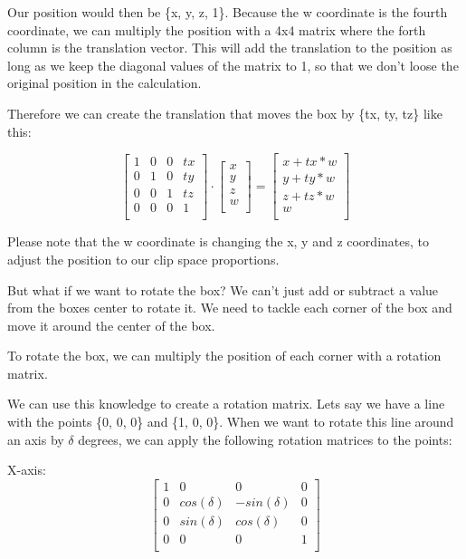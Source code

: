 \documentclass[12pt]{report} \usepackage{preamble}
\begin{document}
Our position would then be \{x, y, z, 1\}. Because the w coordinate is the
fourth coordinate, we can multiply the position with a 4x4 matrix where
the forth column is the translation vector. This will add the translation
to the position as long as we keep the diagonal values of the matrix to 1,
so that we don't loose the original position in the calculation.

Therefore we can create the translation that moves the box by \{tx, ty, tz\}
like this:

\[
	\begin{bmatrix}
		1 & 0 & 0 & tx \\
		0 & 1 & 0 & ty \\
		0 & 0 & 1 & tz \\
		0 & 0 & 0 & 1  \\
	\end{bmatrix}
	\cdot
	\begin{bmatrix}
		x \\
		y \\
		z \\
		w \\
	\end{bmatrix}
	=
	\begin{bmatrix}
		x + tx*w \\
		y + ty*w \\
		z + tz*w \\
		w        \\
	\end{bmatrix}
\]

Please note that the w coordinate is changing the x, y and z coordinates,
to adjust the position to our clip space proportions.

But what if we want to rotate the box? We can't just add or
subtract a value from the boxes center to rotate it. We need to tackle each
corner of the box and move it around the center of the box.

To rotate the box, we can multiply the position of each corner with a
rotation matrix.

We can use this knowledge to create a rotation matrix. Lets say we have a line with
the points \{0, 0, 0\} and \{1, 0, 0\}.
When we want to rotate this line around an axis by \(\delta\) degrees, we can apply
the following rotation matrices to the points:

X-axis: \[
	\begin{bmatrix}
		1 & 0           & 0            & 0 \\
		0 & cos(\delta) & -sin(\delta) & 0 \\
		0 & sin(\delta) & cos(\delta)  & 0 \\
		0 & 0           & 0            & 1 \\
	\end{bmatrix}
\]
\end{document}
